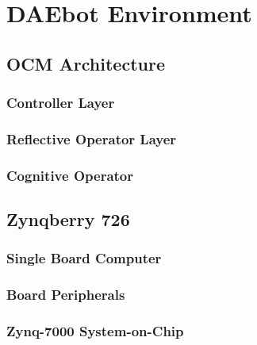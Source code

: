 
\chapter{DAEbot Environment}

\section{OCM Architecture}

\subsection{Controller Layer}

\subsection{Reflective Operator Layer}

\subsection{Cognitive Operator}

\section{Zynqberry 726}

\subsection{Single Board Computer}

\subsection{Board Peripherals}

\subsection{Zynq-7000 System-on-Chip}


